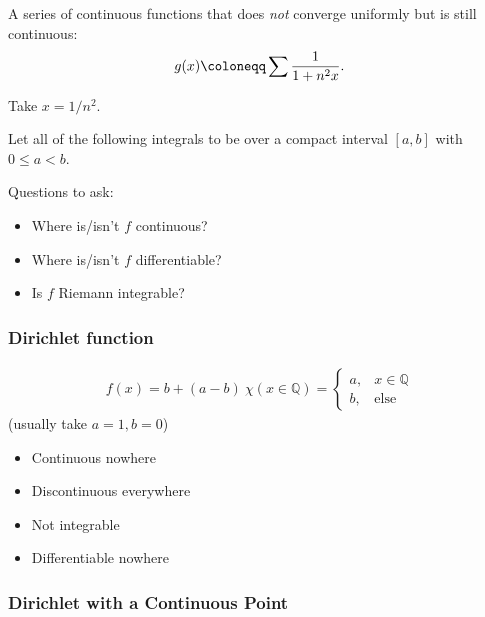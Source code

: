 \begin{example}[?]

A series of continuous functions that does \emph{not} converge uniformly
but is still continuous:
\begin{align*}  
g(x) \coloneqq\sum {1 \over 1 + n^2 x}
.\end{align*}

Take \(x = 1/n^2\).

\end{example}

Let all of the following integrals to be over a compact interval
\([a, b]\) with \(0 \leq a < b\).

Questions to ask:

\begin{itemize}
\tightlist
\item
  Where is/isn't \(f\) continuous?
\item
  Where is/isn't \(f\) differentiable?
\item
  Is \(f\) Riemann integrable?
\end{itemize}

\hypertarget{dirichlet-function}{%
\subsubsection{Dirichlet function}\label{dirichlet-function}}

\begin{align*}
f ( x ) = b + (a-b)~\chi(x\in {\mathbb{Q}}) = \begin{cases}
a, & x\in {\mathbb{Q}}\\
b, & \text{else}
\end{cases}
\end{align*}
(usually take \(a=1, b=0\))

\begin{itemize}
\tightlist
\item
  Continuous nowhere
\item
  Discontinuous everywhere
\item
  Not integrable
\item
  Differentiable nowhere
\end{itemize}

\hypertarget{dirichlet-with-a-continuous-point}{%
\subsubsection{Dirichlet with a Continuous
Point}\label{dirichlet-with-a-continuous-point}}

